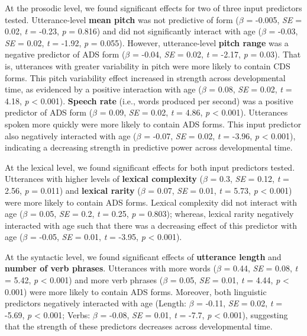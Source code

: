 \documentclass[10pt, letterpaper]{article}
\begin{document}
At the prosodic level, we found significant effects for two of three
input predictors tested. Utterance-level \textbf{mean pitch} was not
predictive of form (\(\beta\) = -0.005, \emph{SE} = 0.02, \emph{t} =
-0.23, \emph{p} = 0.816) and did not significantly interact with age
(\(\beta\) = -0.03, \emph{SE} = 0.02, \emph{t} = -1.92, \emph{p} =
0.055). However, utterance-level \textbf{pitch range} was a negative
predictor of ADS form (\(\beta\) = -0.04, \emph{SE} = 0.02, \emph{t} =
-2.17, \emph{p} = 0.03). That is, utterances with greater variability in
pitch were more likely to contain CDS forms. This pitch variability
effect increased in strength across developmental time, as evidenced by
a positive interaction with age (\(\beta\) = 0.08, \emph{SE} = 0.02,
\emph{t} = 4.18, \emph{p} \textless{} 0.001). \textbf{Speech rate}
(i.e., words produced per second) was a positive predictor of ADS form
(\(\beta\) = 0.09, \emph{SE} = 0.02, \emph{t} = 4.86, \emph{p}
\textless{} 0.001). Utterances spoken more quickly were more likely to
contain ADS forms. This input predictor also negatively interacted with
age (\(\beta\) = -0.07, \emph{SE} = 0.02, \emph{t} = -3.96, \emph{p}
\textless{} 0.001), indicating a decreasing strength in predictive power
across developmental time.

At the lexical level, we found significant effects for both input
predictors tested. Utterances with higher levels of \textbf{lexical
complexity} (\(\beta\) = 0.3, \emph{SE} = 0.12, \emph{t} = 2.56,
\emph{p} = 0.011) and \textbf{lexical rarity} (\(\beta\) = 0.07,
\emph{SE} = 0.01, \emph{t} = 5.73, \emph{p} \textless{} 0.001) were more
likely to contain ADS forms. Lexical complexity did not interact with
age (\(\beta\) = 0.05, \emph{SE} = 0.2, \emph{t} = 0.25, \emph{p} =
0.803); whereas, lexical rarity negatively interacted with age such that
there was a decreasing effect of this predictor with age (\(\beta\) =
-0.05, \emph{SE} = 0.01, \emph{t} = -3.95, \emph{p} \textless{} 0.001).

At the syntactic level, we found significant effects of
\textbf{utterance length} and \textbf{number of verb phrases}.
Utterances with more words (\(\beta\) = 0.44, \emph{SE} = 0.08, \emph{t}
= 5.42, \emph{p} \textless{} 0.001) and more verb phrases (\(\beta\) =
0.05, \emph{SE} = 0.01, \emph{t} = 4.44, \emph{p} \textless{} 0.001)
were more likely to contain ADS forms. Moreover, both linguistic
predictors negatively interacted with age (Length: \(\beta\) = -0.11,
\emph{SE} = 0.02, \emph{t} = -5.69, \emph{p} \textless{} 0.001; Verbs:
\(\beta\) = -0.08, \emph{SE} = 0.01, \emph{t} = -7.7, \emph{p}
\textless{} 0.001), suggesting that the strength of these predictors
decreases across developmental time.
\end{document}
